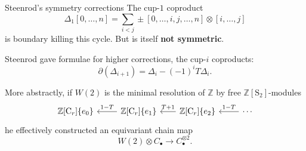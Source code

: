 \documentclass[10pt,t]{beamer} %
\renewcommand{\S}{\mathrm{S}}
\newcommand{\C}{\mathrm{C}}
\begin{document}
\begin{frame}[fragile]{Steenrod's symmetry corrections}
	The cup-$1$ coproduct
	\begin{equation*}
	\Delta_1 [0, \dots, n] = \sum_{i<j} \pm [0, \dots, i, j, \dots, n] \otimes [i, \dots, j]
	\end{equation*}
	is boundary killing this cycle. But is itself \textbf{not symmetric}.
	
	\vspace*{10pt} \pause
	
	Steenrod gave formulae for higher corrections, the cup-$i$ coproducts:
	\begin{equation*}
	\partial (\Delta_{i+1}) = \Delta_i - (-1)^i T \Delta_i.
	\end{equation*}
	
	\vspace*{0pt}\pause
	
	More abstractly, if $W(2)$ is the minimal resolution of $\mathbb Z$ by free $\mathbb Z[\S_2]$-modules
	\begin{equation*}
	\begin{tikzcd}[column sep=normal]
	\mathbb{Z}[\C_r]\{e_0\} & \arrow[l, "1-T"'] \mathbb{Z}[\C_r]\{e_1\} &[-5pt] \arrow[l, "T+1"']
	\mathbb{Z}[\C_r]\{e_2\} & \arrow[l, "1-T"'] \cdots
	\end{tikzcd}
	\end{equation*}
	\pause he effectively constructed an equivariant chain map
	\begin{equation*}
	W(2) \otimes C_\bullet \to C_\bullet^{\otimes 2}.
	\end{equation*}
\end{frame}
	
\end{document}
